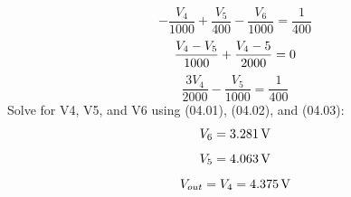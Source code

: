 \documentclass[12pt]{article}
\begin{document}
\begin{equation}
    -\frac{V_4}{1000} + \frac{V_5}{400} - \frac{V_6}{1000} = \frac{1}{400}
    \tag{04.02}
\end{equation}
\begin{equation}
    \frac{V_4- V_5}{1000} + \frac{V_4 - 5}{2000} = 0 
    \notag
\end{equation}
\begin{equation}
    \frac{3V_4}{2000} - \frac{V_5}{1000} = \frac{1}{400}
    \tag{04.03}
\end{equation}
\noindent Solve for V4, V5, and V6 using (04.01), (04.02), and (04.03): 
\begin{equation}
    V_6 = \SI{3.281}{V} 
    \notag
\end{equation}
\begin{equation}
    V_5 = \SI{4.063}{V} 
    \notag
\end{equation}
\begin{equation}
   V_{out} = V_4 = \SI{4.375}{V} 
    \notag
\end{equation}
\end{document}
